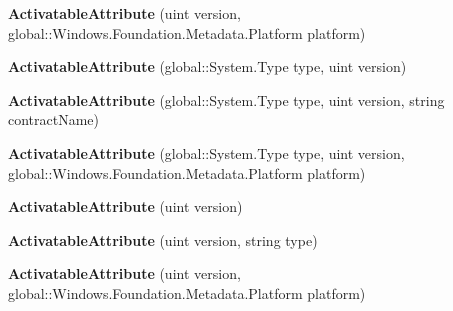 \begin{DoxyCompactItemize}
\item 
\mbox{\label{class_windows_1_1_foundation_1_1_metadata_1_1_activatable_attribute_a94c9a8436dde14583be0384f58dde314}} 
{\bfseries Activatable\+Attribute} (uint version, global\+::\+Windows.\+Foundation.\+Metadata.\+Platform platform)
\item 
\mbox{\label{class_windows_1_1_foundation_1_1_metadata_1_1_activatable_attribute_a0c631c7846b8e88aacfc234b13f25fa3}} 
{\bfseries Activatable\+Attribute} (global\+::\+System.\+Type type, uint version)
\item 
\mbox{\label{class_windows_1_1_foundation_1_1_metadata_1_1_activatable_attribute_a765085efebfd0bcd0be210e056f09933}} 
{\bfseries Activatable\+Attribute} (global\+::\+System.\+Type type, uint version, string contract\+Name)
\item 
\mbox{\label{class_windows_1_1_foundation_1_1_metadata_1_1_activatable_attribute_a406f07b4e02527c717e7403d999d4443}} 
{\bfseries Activatable\+Attribute} (global\+::\+System.\+Type type, uint version, global\+::\+Windows.\+Foundation.\+Metadata.\+Platform platform)
\item 
\mbox{\label{class_windows_1_1_foundation_1_1_metadata_1_1_activatable_attribute_acdb0cd22e6352e90c6da8ee2c53564ce}} 
{\bfseries Activatable\+Attribute} (uint version)
\item 
\mbox{\label{class_windows_1_1_foundation_1_1_metadata_1_1_activatable_attribute_a74a27250c3f2d52a6ab6bc53f78594df}} 
{\bfseries Activatable\+Attribute} (uint version, string type)
\item 
\mbox{\label{class_windows_1_1_foundation_1_1_metadata_1_1_activatable_attribute_a94c9a8436dde14583be0384f58dde314}} 
{\bfseries Activatable\+Attribute} (uint version, global\+::\+Windows.\+Foundation.\+Metadata.\+Platform platform)

\end{DoxyCompactItemize}

